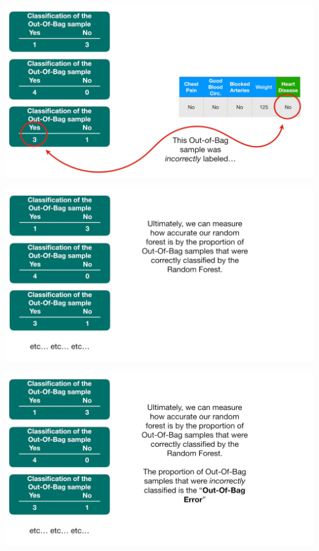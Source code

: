 \documentclass[
  ignorenonframetext,
]{beamer}
\begin{document}
\begin{frame}{}
\protect\hypertarget{section-83}{}
\includegraphics{images/r84.png}
\end{frame}

\begin{frame}{}
\protect\hypertarget{section-84}{}
\includegraphics{images/r85.png}
\end{frame}

\begin{frame}{}
\protect\hypertarget{section-85}{}
\includegraphics{images/r86.png}
\end{frame}
\end{document}
